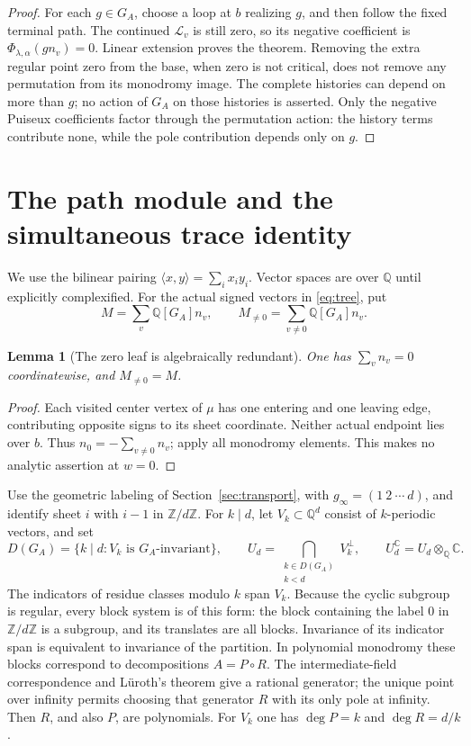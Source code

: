 \documentclass[11pt]{article}
\numberwithin{equation}{section}
\newtheorem{lemma}[theorem]{Lemma}
\theoremstyle{definition}\newtheorem{definition}[theorem]{Definition}
\theoremstyle{remark}\newtheorem{remark}[theorem]{Remark}
\newcommand{\C}{\mathbb C}
\newcommand{\Q}{\mathbb Q}
\newcommand{\UC}{U_d^{\C}}
\begin{document}
\begin{proof}
For each $g\in G_A$, choose a loop at $b$ realizing $g$, and then follow
the fixed terminal path. The continued $\mathscr L_v$ is still zero, so
its negative coefficient is $\Phi_{\lambda,\alpha}(g n_v)=0$.
Linear extension proves the theorem. Removing the extra regular point
zero from the base, when zero is not critical, does not remove any
permutation from its monodromy image. The complete histories can depend
on more than $g$; no action of $G_A$ on those histories is asserted.
Only the negative Puiseux coefficients factor through the permutation
action: the history terms contribute none, while the pole contribution
depends only on $g$.
\end{proof}

\section{The path module and the simultaneous trace identity}\label{sec:module}
We use the bilinear pairing $\langle x,y\rangle=\sum_i x_i y_i$.
Vector spaces are over $\Q$ until explicitly complexified.
For the actual signed vectors in \eqref{eq:tree}, put
\[
 M=\sum_v\Q[G_A]n_v,\qquad M_{\ne0}=\sum_{v\ne0}\Q[G_A]n_v.
\]
\begin{lemma}[The zero leaf is algebraically redundant]\label{lem:zero-leaf}
One has $\sum_v n_v=0$ coordinatewise, and $M_{\ne0}=M$.
\end{lemma}
\begin{proof}
Each visited center vertex of $\mu$ has one entering and one leaving
edge, contributing opposite signs to its sheet coordinate. Neither actual
endpoint lies over $b$. Thus $n_0=-\sum_{v\ne0}n_v$; apply all monodromy
elements. This makes no analytic assertion at $w=0$.
\end{proof}

Use the geometric labeling of Section~\ref{sec:transport}, with
$g_\infty=(1\ 2\ \cdots\ d)$, and identify sheet $i$ with $i-1$ in
$\mathbb Z/d\mathbb Z$. For $k\mid d$, let $V_k\subset\Q^d$ consist of $k$-periodic vectors, and set
\begin{equation}\label{eq:top-component}
 D(G_A)=\{k\mid d:V_k\text{ is }G_A\text{-invariant}\},\qquad
 U_d=\bigcap_{\substack{k\in D(G_A)\\k<d}}V_k^\perp,
 \qquad \UC=U_d\otimes_\Q\C.
\end{equation}
The indicators of residue classes modulo $k$ span $V_k$. Because the
cyclic subgroup is regular, every block system is of this form: the
block containing the label $0$ in $\mathbb Z/d\mathbb Z$ is a subgroup,
and its translates are all blocks. Invariance of its indicator span is
equivalent to invariance of the partition. In polynomial monodromy these
blocks correspond to decompositions $A=P\circ R$. The intermediate-field
correspondence and L\"uroth's theorem give a rational generator; the
unique point over infinity permits choosing that generator $R$ with
its only pole at infinity. Then $R$, and also $P$, are polynomials.
For $V_k$ one has $\deg P=k$ and $\deg R=d/k$.
\end{document}
